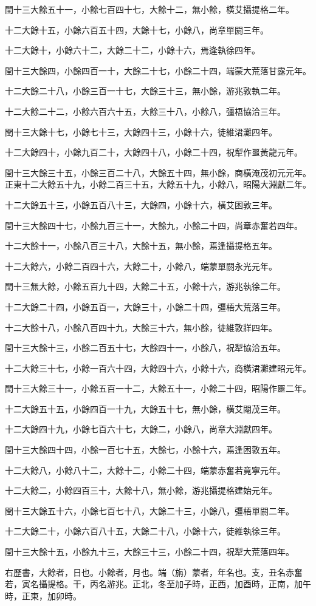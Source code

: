 閏十三大餘五十一，小餘七百四十七，大餘十二，無小餘，橫艾攝提格二年。

十二大餘十五，小餘六百五十四，大餘十七，小餘八，尚章單閼三年。

十二大餘十，小餘六十二，大餘二十二，小餘十六，焉逢執徐四年。

閏十三大餘四，小餘四百一十，大餘二十七，小餘二十四，端蒙大荒落甘露元年。

十二大餘二十八，小餘三百一十七，大餘三十三，無小餘，游兆敦執二年。

十二大餘二十二，小餘六百六十五，大餘三十八，小餘八，彊梧協洽三年。

閏十三大餘十七，小餘七十三，大餘四十三，小餘十六，徒維涒灘四年。

十二大餘四十，小餘九百二十，大餘四十八，小餘二十四，祝犁作噩黃龍元年。

閏十三大餘三十五，小餘三百二十八，大餘五十四，無小餘，商橫淹茂初元元年。正東十二大餘五十九，小餘二百三十五，大餘五十九，小餘八，昭陽大淵獻二年。

十二大餘五十三，小餘五百八十三，大餘四，小餘十六，橫艾困敦三年。

閏十三大餘四十七，小餘九百三十一，大餘九，小餘二十四，尚章赤奮若四年。

十二大餘十一，小餘八百三十八，大餘十五，無小餘，焉逢攝提格五年。

十二大餘六，小餘二百四十六，大餘二十，小餘八，端蒙單閼永光元年。

閏十三無大餘，小餘五百九十四，大餘二十五，小餘十六，游兆執徐二年。

十二大餘二十四，小餘五百一，大餘三十，小餘二十四，彊梧大荒落三年。

十二大餘十八，小餘八百四十九，大餘三十六，無小餘，徒維敦牂四年。

閏十三大餘十三，小餘二百五十七，大餘四十一，小餘八，祝犁協洽五年。

十二大餘三十七，小餘一百六十四，大餘四十六，小餘十六，商橫涒灘建昭元年。

閏十三大餘三十一，小餘五百一十二，大餘五十一，小餘二十四，昭陽作噩二年。

十二大餘五十五，小餘四百一十九，大餘五十七，無小餘，橫艾閹茂三年。

十二大餘四十九，小餘七百六十七，大餘二，小餘八，尚章大淵獻四年。

閏十三大餘四十四，小餘一百七十五，大餘七，小餘十六，焉逢困敦五年。

十二大餘八，小餘八十二，大餘十二，小餘二十四，端蒙赤奮若竟寧元年。

十二大餘二，小餘四百三十，大餘十八，無小餘，游兆攝提格建始元年。

閏十三大餘五十六，小餘七百七十八，大餘二十三，小餘八，彊梧單閼二年。

十二大餘二十，小餘六百八十五，大餘二十八，小餘十六，徒維執徐三年。

閏十三大餘十五，小餘九十三，大餘三十三，小餘二十四，祝犁大荒落四年。

右歷書，大餘者，日也。小餘者，月也。端（旃）蒙者，年名也。支，丑名赤奮若，寅名攝提格。干，丙名游兆。正北，冬至加子時，正西，加酉時，正南，加午時，正東，加卯時。